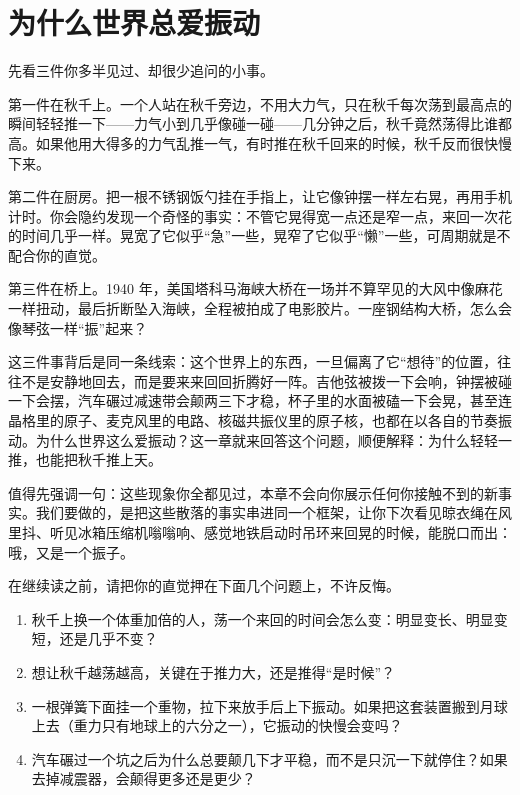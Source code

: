 \chapter{为什么世界总爱振动}


先看三件你多半见过、却很少追问的小事。

第一件在秋千上。一个人站在秋千旁边，不用大力气，只在秋千每次荡到最高点的瞬间轻轻推一下——力气小到几乎像碰一碰——几分钟之后，秋千竟然荡得比谁都高。如果他用大得多的力气乱推一气，有时推在秋千回来的时候，秋千反而很快慢下来。

第二件在厨房。把一根不锈钢饭勺挂在手指上，让它像钟摆一样左右晃，再用手机计时。你会隐约发现一个奇怪的事实：不管它晃得宽一点还是窄一点，来回一次花的时间几乎一样。晃宽了它似乎“急”一些，晃窄了它似乎“懒”一些，可周期就是不配合你的直觉。

第三件在桥上。1940 年，美国塔科马海峡大桥在一场并不算罕见的大风中像麻花一样扭动，最后折断坠入海峡，全程被拍成了电影胶片。一座钢结构大桥，怎么会像琴弦一样“振”起来？

这三件事背后是同一条线索：这个世界上的东西，一旦偏离了它“想待”的位置，往往不是安静地回去，而是要来来回回折腾好一阵。吉他弦被拨一下会响，钟摆被碰一下会摆，汽车碾过减速带会颠两三下才稳，杯子里的水面被磕一下会晃，甚至连晶格里的原子、麦克风里的电路、核磁共振仪里的原子核，也都在以各自的节奏振动。为什么世界这么爱振动？这一章就来回答这个问题，顺便解释：为什么轻轻一推，也能把秋千推上天。

值得先强调一句：这些现象你全都见过，本章不会向你展示任何你接触不到的新事实。我们要做的，是把这些散落的事实串进同一个框架，让你下次看见晾衣绳在风里抖、听见冰箱压缩机嗡嗡响、感觉地铁启动时吊环来回晃的时候，能脱口而出：哦，又是一个振子。


在继续读之前，请把你的直觉押在下面几个问题上，不许反悔。

\begin{enumerate}[leftmargin=2em]
  \item 秋千上换一个体重加倍的人，荡一个来回的时间会怎么变：明显变长、明显变短，还是几乎不变？
  \item 想让秋千越荡越高，关键在于推力大，还是推得“是时候”？
  \item 一根弹簧下面挂一个重物，拉下来放手后上下振动。如果把这套装置搬到月球上去（重力只有地球上的六分之一），它振动的快慢会变吗？
  \item 汽车碾过一个坑之后为什么总要颠几下才平稳，而不是只沉一下就停住？如果去掉减震器，会颠得更多还是更少？
\end{enumerate}

